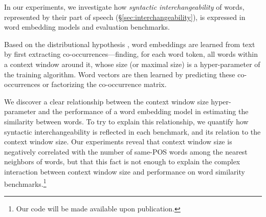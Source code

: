\documentclass[11pt,a4paper]{article}
\begin{document}
    In our experiments, we investigate how
    \textit{syntactic interchangeability} of words,
    represented by their part of speech (\S\ref{sec:interchangeability}),
    is expressed in word embedding models and evaluation benchmarks.
    
    Based on the distributional hypothesis \cite{harris1954distributional},
    word embeddings are learned from text
    by first extracting co-occurrences---finding, for each word token, all
    words within a context window around it,
    whose size (or maximal size) is a hyper-parameter of the training algorithm.
    Word vectors are then learned by predicting these co-occurrences or
    factorizing the co-occurrence matrix.

    We discover a clear relationship between the context window size hyper-parameter
    and the performance of a word embedding model in estimating the similarity between words.
    To try to explain this relationship, we quantify how syntactic interchangeability
    is reflected in each benchmark,
    and its relation to the context window size.
    Our experiments reveal that context window size is negatively correlated
    with the number of same-POS words among the nearest neighbors of words,
    but that this fact is not enough to explain the complex interaction between
    context window size and performance on word similarity
    benchmarks.\footnote{Our code will be made available upon publication.}
    
\end{document}
